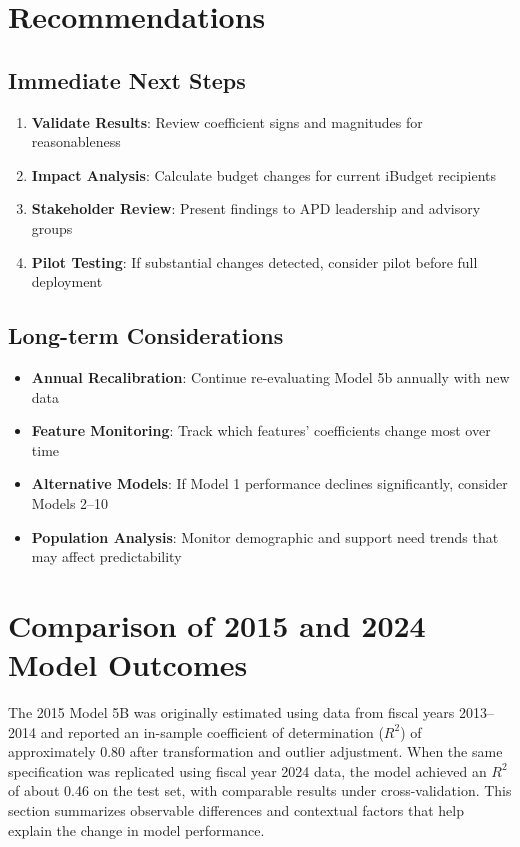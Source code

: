 \section{Recommendations}

\subsection{Immediate Next Steps}

\begin{enumerate}
    \item \textbf{Validate Results}: Review coefficient signs and magnitudes for reasonableness
    \item \textbf{Impact Analysis}: Calculate budget changes for current iBudget recipients
    \item \textbf{Stakeholder Review}: Present findings to APD leadership and advisory groups
    \item \textbf{Pilot Testing}: If substantial changes detected, consider pilot before full deployment
\end{enumerate}

\subsection{Long-term Considerations}

\begin{itemize}
    \item \textbf{Annual Recalibration}: Continue re-evaluating Model 5b annually with new data
    \item \textbf{Feature Monitoring}: Track which features' coefficients change most over time
    \item \textbf{Alternative Models}: If Model 1 performance declines significantly, consider Models 2--10
    \item \textbf{Population Analysis}: Monitor demographic and support need trends that may affect predictability
\end{itemize}


\section{Comparison of 2015 and 2024 Model Outcomes}

The 2015 Model 5B was originally estimated using data from fiscal years 2013--2014 and reported an in-sample coefficient of determination ($R^2$) of approximately 0.80 after transformation and outlier adjustment.  When the same specification was replicated using fiscal year 2024 data, the model achieved an $R^2$ of about 0.46 on the test set, with comparable results under cross-validation.  This section summarizes observable differences and contextual factors that help explain the change in model performance.

